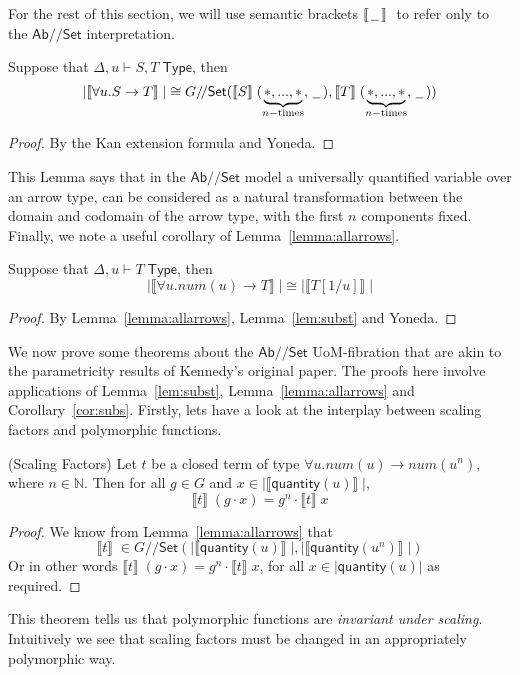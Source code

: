 \documentclass[a4paper,UKenglish]{lipics}
\newcommand{\msf}[1]{\mathsf{#1}} %
\newcommand{\Ab}{\msf{Ab}}
\newcommand{\Set}{\msf{Set}}
\newcommand{\blank}{\, \underline{\hspace{2mm}} \,}
\newcommand{\GroupSet}[1]{#1/\!/\Set}
\newcommand{\AbSet}{\GroupSet{\Ab}}
\newcommand{\GSet}{\GroupSet{G}}
\newcommand{\sem}[1]{\ensuremath{\llbracket #1 \rrbracket} \;}
\newcommand{\num}{\msf{quantity}}
\newcommand{\UoMFibration}{UoM-fibration\xspace}
\begin{document}
For the rest of this section, we will use semantic brackets $\sem{\, \underline{\hspace{2mm}}\, }$ to refer only to the $\AbSet$ interpretation.


\begin{lemma}
\label{lemma:allarrows}
 Suppose that $\Delta, u \vdash S,T \; \msf{ Type}$, then
\[
|\sem{\forall u. S \rightarrow T}| \cong \GSet (\sem{S}(\underbrace{\ast,...,\ast}_{n-\text{times}}, \blank),\sem{T}(\underbrace{\ast,...,\ast}_{n-\text{times}}, \blank))
\]
\end{lemma}
\begin{proof}
By the Kan extension formula and Yoneda.
\end{proof}

This Lemma says that in the $\AbSet$ model a universally quantified variable over an arrow type, can be considered as a natural transformation between the domain and codomain of the arrow type, with the first $n$ components fixed. Finally, we note a useful corollary of Lemma~\ref{lemma:allarrows}.
\begin{corollary}
\label{cor:subs}
Suppose that $\Delta, u \vdash T \; \msf{ Type}$, then
 \[
  |\sem{\forall u . num(u) \rightarrow T}| \cong |\sem{T[1/u]}|
\]
\end{corollary}
\begin{proof}
 By Lemma~\ref{lemma:allarrows}, Lemma~\ref{lem:subst} and Yoneda.
\end{proof}



We now prove some theorems about the $\AbSet$ \UoMFibration that are akin to the parametricity results of Kennedy's original paper. The proofs here involve applications of Lemma~\ref{lem:subst}, Lemma~\ref{lemma:allarrows} and Corollary~\ref{cor:subs}. Firstly, lets have a look at the interplay between scaling factors and polymorphic functions.

\begin{theorem}(Scaling Factors)
\label{thm:ScalFact}
Let $t$ be a closed term of type $\forall u. num(u) \rightarrow num(u^n)$, where $n\in \mathbb{N}$. Then for all $g \in G$ and $x \in |\sem{\num(u)}|$,
\[
\sem{t} (g \cdot x) = g^n \cdot \sem{t} x
\]
\end{theorem}
\begin{proof}
We know from Lemma~\ref{lemma:allarrows} that
\[
\sem{t} \in \GSet(|\sem{\num(u)}|,|\sem{\num(u^n)}|)
\]
Or in other words $\sem{t} (g \cdot x) = g^n \cdot \sem{t} x$, for all $x \in |\num(u)|$ as required.
\end{proof}
This theorem tells us that polymorphic functions are \emph{invariant under scaling}. Intuitively we see that scaling factors must be changed in an appropriately polymorphic way.
\end{document}
